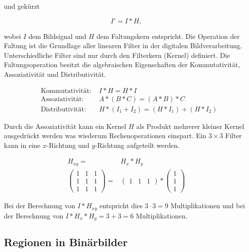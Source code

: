 und gekürzt

\begin{equation}
	I' = I * H,
\end{equation}

wobei $I$ dem Bildsignal und $H$ dem Faltungskern entspricht. Die Operation der Faltung ist die Grundlage aller
 linearen Filter in der digitalen Bildverarbeitung. Unterschiedliche Filter sind nur durch den Filterkern (Kernel)
 definiert. Die Faltungsoperation besitzt die algebraischen Eigenschaften der Kommutativität, Assoziativität und
 Distributivität.

\begin{align}
	&\text{Kommutativität: } &I * H = H * I\\
	&\text{Assoziativität: } &A * (B * C) = (A * B) * C\\
	&\text{Distributivität: } &H * \left(I_1 + I_2\right) = \left(H * I_1\right) + \left(H * I_2\right)
\end{align}

Durch die Assoziativität kann ein Kernel $H$ als Produkt mehrerer kleiner Kernel ausgedrückt werden was wiederum
 Rechenoperationen einspart. Ein $3 \times 3$ Filter kann in eine $x$-Richtung und $y$-Richtung aufgeteilt werden.

\begin{align}
	H_{xy} = & H_x * H_y\\
	\begin{pmatrix}
		1& 1& 1\\
		1& 1& 1\\
		1& 1& 1
	\end{pmatrix} = &
	\begin{pmatrix}
		1& 1& 1
	\end{pmatrix}
	*
	\begin{pmatrix}
		1\\
		1\\
		1
	\end{pmatrix}
\end{align}

Bei der Berechnung von $I * H_{xy}$ entspricht dies $3 \cdot 3 = 9$ Multiplikationen und bei der Berechnung von
 $I * H_x * H_y = 3 + 3 = 6$ Multiplikationen.


\subsection{Regionen in Binärbilder} %
\label{sec:regionen_in_binärbilder}

